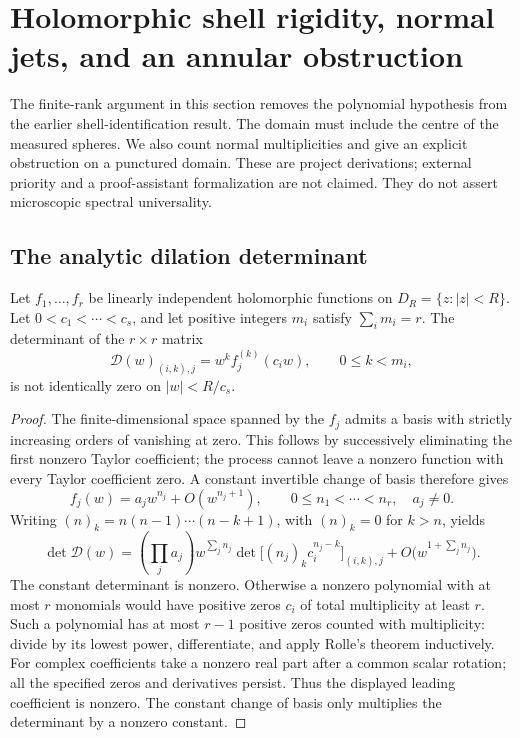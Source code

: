 \section{Holomorphic shell rigidity, normal jets, and an annular obstruction}
\label{sec:holomorphic-shell}
The finite-rank argument in this section removes the polynomial hypothesis
from the earlier shell-identification result. The domain must include the
centre of the measured spheres. We also count normal multiplicities and give
an explicit obstruction on a punctured domain. These are project derivations;
external priority and a proof-assistant formalization are not claimed.
They do not assert microscopic spectral universality.

\subsection{The analytic dilation determinant}
\begin{lemma}\label{lem:dilation-jets}
Let $f_1,\ldots,f_r$ be linearly independent holomorphic functions on
$D_R=\{z:|z|<R\}$. Let $0<c_1<\cdots<c_s$, and let positive integers
$m_i$ satisfy $\sum_i m_i=r$. The determinant of the $r\times r$ matrix
\[
 \mathcal D(w)_{(i,k),j}=w^k f_j^{(k)}(c_iw),
 \qquad 0\le k<m_i,
\]
is not identically zero on $|w|<R/c_s$.
\end{lemma}
\begin{proof}
The finite-dimensional space spanned by the $f_j$ admits a basis with
strictly increasing orders of vanishing at zero. This follows by successively
eliminating the first nonzero Taylor coefficient; the process cannot leave a
nonzero function with every Taylor coefficient zero. A constant invertible
change of basis therefore gives
\[
 f_j(w)=a_jw^{n_j}+O(w^{n_j+1}),\qquad
 0\le n_1<\cdots<n_r,\quad a_j\ne0.
\]
Writing $(n)_k=n(n-1)\cdots(n-k+1)$, with $(n)_k=0$ for $k>n$, yields
\[
 \det\mathcal D(w)=\left(\prod_j a_j\right)w^{\sum_jn_j}
 \det\bigl[(n_j)_k c_i^{n_j-k}\bigr]_{(i,k),j}
 +O\bigl(w^{1+\sum_jn_j}\bigr).
\]
The constant determinant is nonzero. Otherwise a nonzero polynomial with at
most $r$ monomials would have positive zeros $c_i$ of total multiplicity at
least $r$. Such a polynomial has at most $r-1$ positive zeros counted with
multiplicity: divide by its lowest power, differentiate, and apply Rolle's
theorem inductively. For complex coefficients take a nonzero real part after
a common scalar rotation; all the specified zeros and derivatives persist.
Thus the displayed leading coefficient is nonzero. The constant change of
basis only multiplies the determinant by a nonzero constant.
\end{proof}

